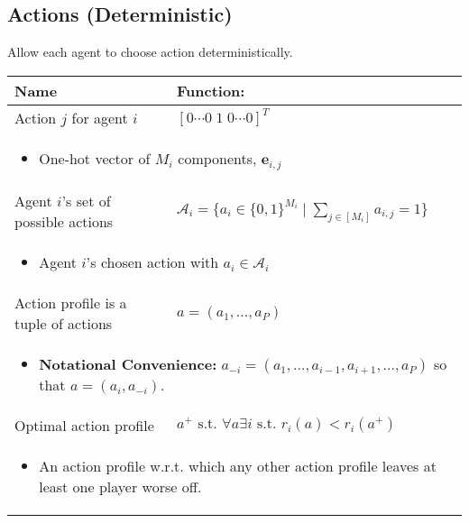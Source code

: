 \subsection{Actions (Deterministic)}
\begin{summary} Allow each agent to choose action deterministically.
    \begin{center}
        \begin{tabular}{ll}
            \toprule
            \textbf{Name} & \textbf{Function:} \\
            \midrule
            Action $j$ for agent $i$ & $[0 \cdots 0 \; 1 \; 0 \cdots 0]^T$ \\
            \midrule
            \multicolumn{2}{p{\linewidth}}{
                \begin{itemize}
                    \item One-hot vector of $M_i$ components, $\mathbf{e}_{i,j}$
                \end{itemize}} \\
            \midrule
            Agent $i$'s set of possible actions & $\mathcal{A}_i = \{a_i \in \{0,1\}^{M_i} \mid \sum_{j \in [M_i]} a_{i,j} = 1\}$ \\
            \multicolumn{2}{p{\linewidth}}{
                \begin{itemize}
                    \item Agent $i$'s chosen action with $a_i \in \mathcal{A}_i$
                \end{itemize}} \\
            \midrule
            Action profile is a tuple of actions & $a=(a_1,\ldots,a_P)$ \\
            \multicolumn{2}{p{\linewidth}}{
                \begin{itemize}
                    \item \textbf{Notational Convenience:} $a_{-i} = (a_1,\ldots,a_{i-1},a_{i+1},\ldots,a_P)$ so that $a=(a_i,a_{-i})$. 
                \end{itemize}} \\
            \midrule 
            Optimal action profile & $a^+ \text{ s.t. } \forall a \exists i \text{ s.t. } r_i(a) < r_i(a^+)$ \\
            \multicolumn{2}{p{\linewidth}}{
                \begin{itemize}
                    \item An action profile w.r.t. which any other action profile leaves at least one player worse off.
                \end{itemize}} \\

\end{tabular}
\end{center}
\end{summary}
